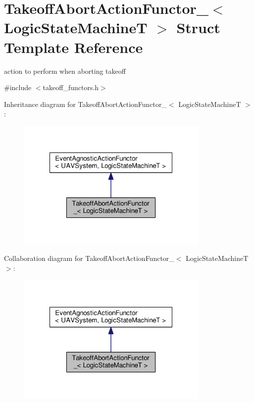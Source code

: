 \hypertarget{structTakeoffAbortActionFunctor__}{\section{Takeoff\-Abort\-Action\-Functor\-\_\-$<$ Logic\-State\-Machine\-T $>$ Struct Template Reference}
\label{structTakeoffAbortActionFunctor__}
}


action to perform when aborting takeoff  




{\ttfamily \#include $<$takeoff\-\_\-functors.\-h$>$}



Inheritance diagram for Takeoff\-Abort\-Action\-Functor\-\_\-$<$ Logic\-State\-Machine\-T $>$\-:\nopagebreak
\begin{figure}[H]
\begin{center}
\leavevmode
\includegraphics[width=264pt]{structTakeoffAbortActionFunctor____inherit__graph}
\end{center}
\end{figure}


Collaboration diagram for Takeoff\-Abort\-Action\-Functor\-\_\-$<$ Logic\-State\-Machine\-T $>$\-:\nopagebreak
\begin{figure}[H]
\begin{center}
\leavevmode
\includegraphics[width=264pt]{structTakeoffAbortActionFunctor____coll__graph}
\end{center}
\end{figure}
